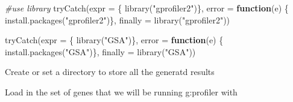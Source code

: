 \documentclass[
]{book}
\newenvironment{Shaded}{\begin{snugshade}}{\end{snugshade}}
\newcommand{\AttributeTok}[1]{\textcolor[rgb]{0.77,0.63,0.00}{#1}}
\newcommand{\CommentTok}[1]{\textcolor[rgb]{0.56,0.35,0.01}{\textit{#1}}}
\newcommand{\ConstantTok}[1]{\textcolor[rgb]{0.00,0.00,0.00}{#1}}
\newcommand{\ControlFlowTok}[1]{\textcolor[rgb]{0.13,0.29,0.53}{\textbf{#1}}}
\newcommand{\FunctionTok}[1]{\textcolor[rgb]{0.00,0.00,0.00}{#1}}
\newcommand{\NormalTok}[1]{#1}
\newcommand{\OtherTok}[1]{\textcolor[rgb]{0.56,0.35,0.01}{#1}}
\newcommand{\SpecialCharTok}[1]{\textcolor[rgb]{0.00,0.00,0.00}{#1}}
\newcommand{\StringTok}[1]{\textcolor[rgb]{0.31,0.60,0.02}{#1}}
\begin{document}
\begin{Shaded}
\begin{Highlighting}[]
\CommentTok{\#use library}
\FunctionTok{tryCatch}\NormalTok{(}\AttributeTok{expr =}\NormalTok{ \{ }\FunctionTok{library}\NormalTok{(}\StringTok{"gprofiler2"}\NormalTok{)\}, }
         \AttributeTok{error =} \ControlFlowTok{function}\NormalTok{(e) \{ }
           \FunctionTok{install.packages}\NormalTok{(}\StringTok{"gprofiler2"}\NormalTok{)\}, }
         \AttributeTok{finally =} \FunctionTok{library}\NormalTok{(}\StringTok{"gprofiler2"}\NormalTok{))}

\FunctionTok{tryCatch}\NormalTok{(}\AttributeTok{expr =}\NormalTok{ \{ }\FunctionTok{library}\NormalTok{(}\StringTok{"GSA"}\NormalTok{)\}, }
         \AttributeTok{error =} \ControlFlowTok{function}\NormalTok{(e) \{ }
           \FunctionTok{install.packages}\NormalTok{(}\StringTok{"GSA"}\NormalTok{)\}, }
         \AttributeTok{finally =} \FunctionTok{library}\NormalTok{(}\StringTok{"GSA"}\NormalTok{))}
\end{Highlighting}
\end{Shaded}

Create or set a directory to store all the generatd results

\begin{Shaded}
\end{Shaded}

Load in the set of genes that we will be running g:profiler with

\begin{Shaded}
\end{Shaded}
\end{document}

